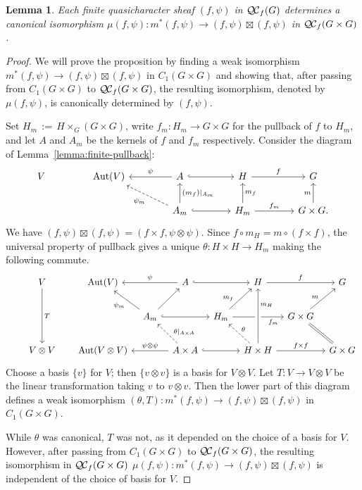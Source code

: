 \documentclass{amsart}
\theoremstyle{plain}
\newtheorem{lemma}[theorem]{Lemma}
\theoremstyle{definition}
\theoremstyle{remark}
\DeclareMathOperator{\Aut}{Aut}
\newcommand{\ceq}{{\, :=\, }}
\newcommand{\QC}{{\mathcal{Q\hskip-0.8pt C}}}
\newcommand{\QCf}{{\QC_f}}
\begin{document}
\begin{lemma}\label{lemma:finite-iso}
Each finite quasicharacter sheaf $(f,\psi)$ in $\QCf(G)$ determines a
canonical isomorphism $\mu(f,\psi) : m^*(f,\psi) \to (f,\psi)\boxtimes(f,\psi)$ in $\QCf(G\times G)$.
 \end{lemma}

\begin{proof}
We will prove the proposition by finding a weak isomorphism
$m^*(f,\psi) \to (f,\psi)\boxtimes (f,\psi)$ in $C_1(G\times G)$
and showing that, after passing from $C_1(G\times G)$ to
$\QCf(G\times G)$, the resulting isomorphism,
denoted by $\mu(f,\psi)$, is canonically determined by $(f,\psi)$.

Set $H_m \ceq H\times_G(G\times G)$,
write $f_m : H_m \to G \times G$ for the pullback of $f$ to $H_m$,
and let $A$ and $A_m$ be the kernels of $f$ and $f_m$ respectively.  Consider the diagram of Lemma~\ref{lemma:finite-pullback}:
\[
\begin{tikzcd}[column sep=40]
V & \Aut(V) & \arrow[swap]{l}{\psi} A \arrow[hook]{r} & H \arrow{r}{f} &  G\\
  &  & \arrow[dashed]{ul}{\psi_m} \arrow[swap]{u}{(m_f)\vert_{A_m}} A_m \arrow[hook]{r}
  & \arrow[swap]{u}{m_f} H_m \arrow{r}{f_m} & \arrow{u}{m} G\times G.
\end{tikzcd}
\]
We have $(f,\psi) \boxtimes (f,\psi) = (f\times f, \psi\otimes \psi)$.
Since $f\circ m_H = m \circ (f\times f)$, the universal property of pullback gives
a unique $\theta : H\times H \to H_m$ making the following commute.
\[
\begin{tikzcd}[row sep=20,column sep=8]
\ & V \arrow{dd}{T} && \Aut(V) && A \arrow[hook]{rr} \arrow[swap]{ll}{\psi} &&  H \arrow{rr}{f} && G\\
 && && \arrow{ul}{\psi_m} A_m  \arrow[hook]{rr} \arrow{ur} && H_m \arrow[pos=0.3]{ur}{m_f} \arrow[swap, pos=0.8]{rr}{f_m}
 && G \times G \arrow[equal]{dr} \arrow[pos=0.42]{ur}{m} & \\
& V\otimes V && \Aut(V\otimes V) && \arrow[swap]{ll}{\psi \otimes \psi} \arrow[dashed,swap,pos=0.3]{ul}{\theta\vert_{A\times A}} A\times A \arrow[hook]{rr}
&& \arrow[dashed,swap]{ul}{\theta} \arrow[crossing over,swap,pos=0.7]{uu}{m_H} H\times H \arrow{rr}{f\times f} && G\times G
\end{tikzcd}
\]
Choose a basis $\{ v \}$ for $V$; then $\{ v\otimes v \}$ is a basis for $V\otimes V$.
Let $T : V \to V\otimes V$ be the linear transformation taking $v$ to $v\otimes v$. Then the lower part of this
diagram defines a weak isomorphism $(\theta,T): m^*(f,\psi) \to (f,\psi)\boxtimes (f,\psi)$  in $C_1(G\times G)$.

While $\theta$ was canonical, $T$ was not, as it depended on the choice of a basis for $V$.
However, after passing from $C_1(G\times G)$ to $\QCf(G\times G)$, the resulting isomorphism in $\QCf(G\times G)$
$\mu(f,\psi): m^*(f,\psi) \to (f,\psi)\boxtimes (f,\psi)$ is independent of the choice of basis for $V$.
 \end{proof}
\end{document}
